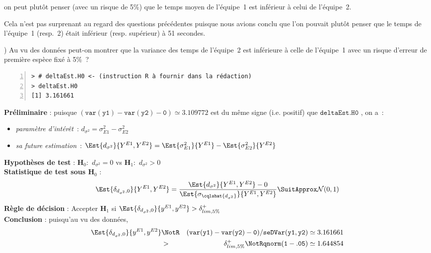 \documentclass[10pt]{report}
\begin{document}
\begin{exercice}
\begin{Correction}
on peut plutôt penser (avec un risque de 5\%) que le temps moyen de l'équipe~1 est inférieur à celui de l'équipe~2.

Cela n'est pas surprenant au regard des questions précédentes puisque nous avions conclu que l'on pouvait plutôt penser que le temps de l'équipe~1 (resp.~2) était inférieur (resp. supérieur) à 51 secondes. 
\end{Correction}


) Au vu des données peut-on montrer que la variance des temps de l'équipe~2 est inférieure à celle de l'équipe~1  avec un risque d'erreur de première espèce fixé à 5\%~?\\
\IndicR
\begin{Verbatim}[frame=leftline,fontfamily=tt,fontshape=n,numbers=left]
> # deltaEst.H0 <- (instruction R à fournir dans la rédaction)
> deltaEst.H0
[1] 3.161661
\end{Verbatim}



\begin{Correction}
\noindent \textbf{Préliminaire} : puisque $\mathtt{(var(y1)-var(y2)-0)}\simeq3.109772$ est du même signe (i.e. positif) que $\mathtt{deltaEst.H0}$ , on a~: 
      \begin{itemize}
\item \textit{paramètre d'intérêt}~: $d_{\sigma^2}=\sigma^2_{E1}-\sigma^2_{E2}$
\item \textit{sa future estimation}~: $\Est{d_{\sigma^2}}{Y^{E1},Y^{E2}}=\Est{\sigma^2_{E1}}{Y^{E1}}-\Est{\sigma^2_{E2}}{Y^{E2}}$
\end{itemize}
\noindent \textbf{Hypothèses de test} : $\mathbf{H}_0:$ $d_{\sigma^2}=0$ vs {\large $\mathbf{H}_1:$ $d_{\sigma^2}>0$}\\
\textbf{Statistique de test sous $\mathbf{H}_0$} :
  $$
  \Est{\delta_{d_{\sigma^2},0}}{Y^{E1},Y^{E2}}= {\displaystyle \frac{\Est{d_{\sigma^2}}{Y^{E1},Y^{E2}}-0}{
\Est{\sigma_{\cqlshat{d_{\sigma^2}}}}{Y^{E1},Y^{E2}}
}} 
  \SuitApprox \mathcal{N}(0,1)
  $$
\textbf{Règle de décision} : Accepter $\mathbf{H}_1$ si 
  $\Est{\delta_{d_{\sigma^2},0}}{y^{E1},y^{E2}} > \delta^+_{lim,5\%}$\\
\noindent \textbf{Conclusion} :
puisqu'au vu des données, 
  \begin{eqnarray*}
\Est{\delta_{d_{\sigma^2},0}}{y^{E1},y^{E2}} &\NotR&\mathtt{(var(y1)-var(y2)-0)/seDVar(y1,y2)}\simeq 3.161661\\& >  & \delta^+_{lim,5\%} \NotR \mathtt{qnorm(1-.05)}\simeq1.644854
\end{eqnarray*}
  

\end{Correction}
\end{exercice}
\end{document}
